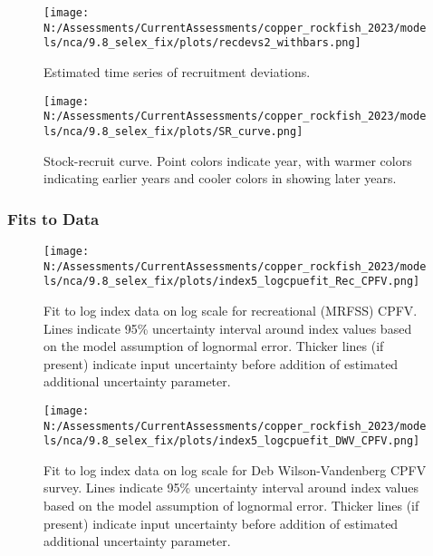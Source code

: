 \documentclass[11pt,
  english,
  letterpaper,
]{article}
\begin{document}
\pagebreak

\begin{figure}
\centering
\texttt{[image: N:/Assessments/CurrentAssessments/copper\_rockfish\_2023/models/nca/9.8\_selex\_fix/plots/recdevs2\_withbars.png]}
\caption{Estimated time series of recruitment deviations.\label{fig:rec-devs}}
\end{figure}

\pagebreak

\begin{figure}
\centering
\texttt{[image: N:/Assessments/CurrentAssessments/copper\_rockfish\_2023/models/nca/9.8\_selex\_fix/plots/SR\_curve.png]}
\caption{Stock-recruit curve. Point colors indicate year, with warmer colors indicating earlier years and cooler colors in showing later years.\label{fig:bh-curve}}
\end{figure}

\pagebreak

\hypertarget{fits-to-data}{%
\subsubsection{Fits to Data}\label{fits-to-data}}

\begin{figure}
\centering
\texttt{[image: N:/Assessments/CurrentAssessments/copper\_rockfish\_2023/models/nca/9.8\_selex\_fix/plots/index5\_logcpuefit\_Rec\_CPFV.png]}
\caption{Fit to log index data on log scale for recreational (MRFSS) CPFV. Lines indicate 95\% uncertainty interval around index values based on the model assumption of lognormal error. Thicker lines (if present) indicate input uncertainty before addition of estimated additional uncertainty parameter.\label{fig:mrfss-cpfv-index-fit}}
\end{figure}

\pagebreak

\begin{figure}
\centering
\texttt{[image: N:/Assessments/CurrentAssessments/copper\_rockfish\_2023/models/nca/9.8\_selex\_fix/plots/index5\_logcpuefit\_DWV\_CPFV.png]}
\caption{Fit to log index data on log scale for Deb Wilson-Vandenberg CPFV survey. Lines indicate 95\% uncertainty interval around index values based on the model assumption of lognormal error. Thicker lines (if present) indicate input uncertainty before addition of estimated additional uncertainty parameter.\label{fig:dwv-cpfv-index-fit}}
\end{figure}
\end{document}
